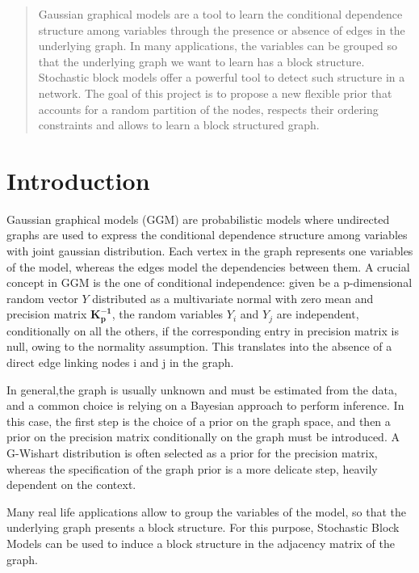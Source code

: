 


\begin{abstract} %
Gaussian graphical models are a tool to learn the conditional dependence structure among variables through the presence or absence of edges in the underlying graph. In many applications, the variables can be grouped so that the underlying graph we want to learn has a block structure. Stochastic block models offer a powerful tool to detect such structure in a network. The goal of this project is to propose a new flexible prior that accounts for a random partition of the nodes, respects their ordering constraints and allows to learn a block structured graph.
\end{abstract}


\section{Introduction}

Gaussian graphical models (GGM) are probabilistic models where undirected graphs are used to express the conditional dependence structure among variables with joint gaussian distribution. Each vertex in the graph represents one variables of the model, whereas the edges model the dependencies between them. A crucial concept in GGM is the one of conditional independence: given be a p-dimensional random vector $Y$ distributed as a multivariate normal with zero mean and precision matrix $\mathbf{K_{p}^{-1}}$, the random variables $Y_i$ and $Y_j$ are independent, conditionally on all the others, if the corresponding entry in precision matrix  is null, owing to the normality assumption. This translates into the absence of a direct edge linking nodes i and j in the graph. 

In general,the graph is usually unknown and must be estimated from the data, and a common choice is relying on a Bayesian approach to perform inference. In this case, the first step is the choice of a prior on the graph space, and then a prior on the precision matrix conditionally on the graph must be introduced. A G-Wishart distribution is often selected as a prior for the precision matrix, whereas the specification of the graph prior is a more delicate step, heavily dependent on the context.

Many real life applications allow to group the variables of the model, so that the underlying graph presents a block structure. For this purpose, Stochastic Block Models can be used to induce a block structure in the adjacency matrix of the graph. 

